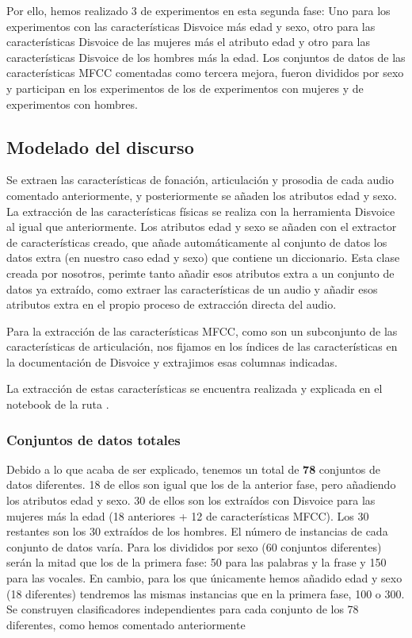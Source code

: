 Por ello, hemos realizado 3  de experimentos en esta segunda fase: Uno para los experimentos con las características Disvoice más edad y sexo, otro para las características Disvoice de las mujeres más el atributo edad y otro para las características Disvoice de los hombres más la edad. Los conjuntos de datos de las características MFCC comentadas como tercera mejora, fueron divididos por sexo y participan en los experimentos de los  de experimentos con mujeres y de experimentos con hombres.


\subsection{Modelado del discurso}
Se extraen las características de fonación, articulación y prosodia de cada audio comentado anteriormente, y posteriormente se añaden los atributos edad y sexo. La extracción de las características físicas se realiza con la herramienta Disvoice al igual que anteriormente. Los atributos edad y sexo se añaden con el extractor de características creado, que añade automáticamente al conjunto de datos los datos extra (en nuestro caso edad y sexo) que contiene un diccionario. Esta clase creada por nosotros, perimte tanto añadir esos atributos extra a un conjunto de datos ya extraído, como extraer las características de un audio y añadir esos atributos extra en el propio proceso de extracción directa del audio.

Para la extracción de las características MFCC, como son un subconjunto de las características de articulación, nos fijamos en los índices de las características en la documentación de Disvoice y extrajimos esas columnas indicadas.

La extracción de estas características se encuentra realizada y explicada en el notebook de la ruta .

\subsubsection{Conjuntos de datos totales}
Debido a lo que acaba de ser explicado, tenemos un total de \textbf{78} conjuntos de datos diferentes. 18 de ellos son igual que los de la anterior fase, pero añadiendo los atributos edad y sexo. 30 de ellos son los extraídos con Disvoice para las mujeres más la edad (18 anteriores + 12 de características MFCC). Los 30 restantes son los 30 extraídos de los hombres. El número de instancias de cada conjunto de datos varía. Para los divididos por sexo (60 conjuntos diferentes) serán la mitad que los de la primera fase: 50 para las palabras y la frase y 150 para las vocales. En cambio, para los que únicamente hemos añadido edad y sexo (18 diferentes) tendremos las mismas instancias que en la primera fase, 100 o 300. Se construyen clasificadores independientes para cada conjunto de los 78 diferentes, como hemos comentado anteriormente

